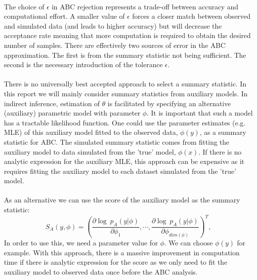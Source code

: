\documentclass[12,fleqn]{article}
\theoremstyle{definition}
\theoremstyle{plain}
\begin{document}

\paragraph{}
The choice of $\epsilon$ in ABC rejection represents a trade-off between accuracy and computational effort. A smaller value of $\epsilon$ forces a closer match between observed and simulated data (and leads to higher accuracy) but will decrease the acceptance rate meaning that more computation is required to obtain the desired number of samples. There are effectively two sources of error in the ABC approximation. The first is from the summary statistic not being sufficient. The second is the necessary introduction of the tolerance $\epsilon$.
\par

\paragraph{}
There is no universally best accepted approach to select a summary statistic. In this report we will mainly consider summary statistics from auxiliary models.  
 In indirect inference, estimation of $\theta$ is facilitated by specifying an alternative (auxiliary) parametric model with parameter $\phi$. It is important that such a model has a tractable likelihood function. One could use the parameter estimates (e.g. MLE) of this auxiliary model fitted to the observed data, $\phi(y)$, as a summary statistic for ABC. The simulated summary statistic comes from fitting the auxiliary model to data simulated from the 'true' model, $\phi(x).$ If there is no analytic expression for the auxiliary MLE, this approach can be expensive as it requires fitting the auxiliary model to each dataset simulated from the 'true' model.
\par

\paragraph{}
As an alternative we can use the score of the auxiliary model as the summary statistic:
\begin{equation}
S_A(y, \phi) =\left( \frac{\partial \log \ p_A(y|\phi)}{\partial \phi_1}, \cdots, \frac{ \partial \log \ p_A(y|\phi)}{\partial \phi_{dim(\phi)} } \right)^T ,
\end{equation}
In order to use this, we need a parameter value for $\phi$. We can choose $\phi(y)$ for example. With this approach, there is a massive improvement in computation time if there is analytic expression for the score as we only need to fit the auxiliary model to observed data once before the ABC analysis. 
\par
\end{document}
